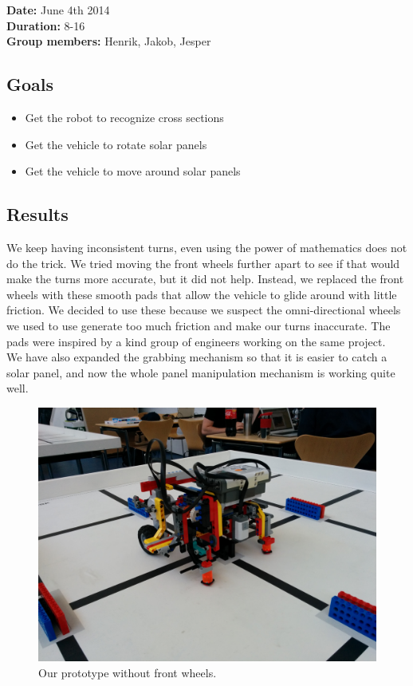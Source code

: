 \textbf{Date:} June 4th 2014\\\textbf{Duration:} 8-16\\\textbf{Group
members:} Henrik, Jakob, Jesper	

\subsection{Goals}

\begin{itemize}
\itemsep1pt\parskip0pt
\item
  Get the robot to recognize cross sections
\item
  Get the vehicle to rotate solar panels
\item
  Get the vehicle to move around solar panels
\end{itemize}

\subsection{Results}

We keep having inconsistent turns, even using the power of mathematics
does not do the trick. We tried moving the front wheels further apart to
see if that would make the turns more accurate, but it did not help.
Instead, we replaced the front wheels with these smooth pads that allow
the vehicle to glide around with little friction. We decided to use
these because we suspect the omni-directional wheels we used to use
generate too much friction and make our turns inaccurate. The pads were
inspired by a kind group of engineers working on the same project.\\We
have also expanded the grabbing mechanism so that it is easier to catch a
solar panel, and now the whole panel manipulation mechanism is working
quite well.

\begin{figure}[hbt]
  \centering
  \includegraphics[scale=0.09]{../experiments/images/betterPrototype.jpg}
  \caption{Our prototype without front wheels.}
\end{figure}
\clearpage

